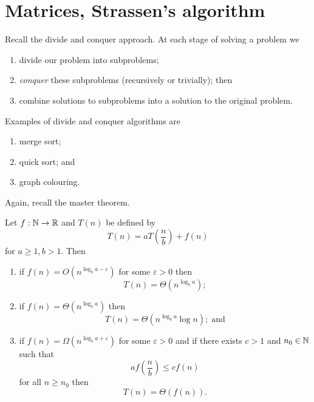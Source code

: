 \chapter{Matrices, Strassen's algorithm}

Recall the divide and conquer approach. At each stage of solving a problem we
\begin{enumerate}
    \item divide our problem into subproblems;
    \item \emph{conquer} these subproblems (recursively or trivially); then
    \item combine solutions to subproblems into a solution to the original problem.
\end{enumerate}

\begin{example}
    Examples of divide and conquer algorithms are
    \begin{enumerate}
        \item merge sort;
        \item quick sort; and
        \item graph colouring.
    \end{enumerate}
\end{example}

Again, recall the master theorem.

\begin{theorem}
    Let $f: \mathbb{N} \to \mathbb{R}$ and $T(n)$ be defined by
    \[ T(n) = aT\left(\frac nb\right) + f(n) \]
    for $a \geq 1, b > 1$. Then
    \begin{enumerate}
        \item if $f(n) = O\left(n^{\log_b{a} - \varepsilon}\right)$ for some $\varepsilon > 0$ then
            \[ T(n) = \Theta\left(n^{\log_b{a}}\right); \]

        \item if $f(n) = \Theta\left(n^{\log_b{a}}\right)$ then
            \[ T(n) = \Theta\left(n^{\log_b{a}}\log{n}\right);\;\text{and} \]

        \item if $f(n) = \Omega\left(n^{\log_ba + \varepsilon}\right)$ for some $\varepsilon > 0$ and if there exists $c > 1$ and $n_0 \in \mathbb{N}$ such that
            \[ af\left(\frac nb\right) \leq cf(n) \]
            for all $n \geq n_0$ then
            \[ T(n) = \Theta(f(n)). \]
    \end{enumerate}
\end{theorem}

